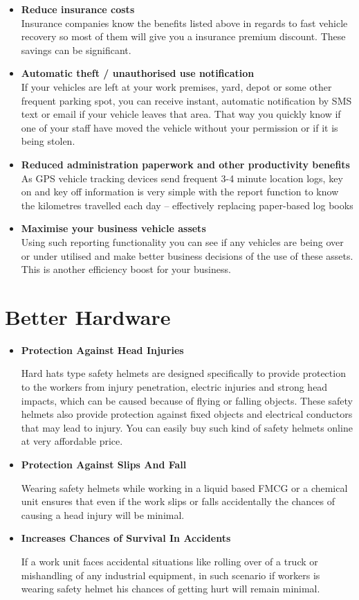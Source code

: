 \begin{itemize}
	\item \textbf{Reduce insurance costs}\\
	Insurance companies know the benefits listed above in regards to fast vehicle recovery so most of them will give you a insurance premium discount.  These savings can be significant.
	
	\item \textbf{Automatic theft / unauthorised use notification}\\
	If your vehicles are left at your work premises, yard, depot or some other frequent parking spot, you can receive instant, automatic notification by SMS text or email if your vehicle leaves that area.  That way you quickly know if one of your staff have moved the vehicle without your permission or if it is being stolen.
	
	\item \textbf{Reduced administration paperwork and other productivity benefits}\\
	As GPS vehicle tracking devices send frequent 3-4 minute location logs, key on and key off information is very simple with the report function to know the kilometres travelled each day – effectively replacing paper-based log books
	
	\item \textbf{Maximise your business vehicle assets}\\
	Using such reporting functionality you can see if any vehicles are being over or under utilised and make better business decisions of the use of these assets.  This is another efficiency boost for your business.
\end{itemize}

\section{Better Hardware }
\begin{itemize}
	\item \textbf{Protection Against Head Injuries}
	
	Hard hats type safety helmets are designed specifically to provide protection to the workers from injury penetration, electric injuries and strong head impacts, which can be caused because of flying or falling objects. These safety helmets also provide protection against fixed objects and electrical conductors that may lead to injury. You can easily buy such kind of safety helmets online at very affordable price.
	
	\item  \textbf{Protection Against Slips And Fall}
	
	Wearing safety helmets while working in a liquid based FMCG or a chemical unit ensures that even if the work slips or falls accidentally the chances of causing a head injury will be minimal.
	
	\item \textbf{Increases Chances of Survival In Accidents}
	
	If a work unit faces accidental situations like rolling over of a truck or mishandling of any industrial equipment, in such scenario if workers is wearing safety helmet his chances of getting hurt will remain minimal.
\end{itemize}